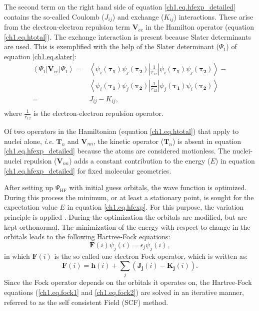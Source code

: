The second term on the right hand side of equation \ref{ch1.eq.hfexp_detailed} contains the so-called Coulomb ($J_{ij}$) and exchange ($K_{ij}$) interactions. These arise from the electron-electron repulsion term $\mathbf{V}_{ee}$ in the Hamilton operator (equation \ref{ch1.eq.htotal}). The exchange interaction is present because Slater determinants are used. This is exemplified with the help of the Slater determinant ($\Psi_1$) of equation \ref{ch1.eq.slater}:
\begin{equation}
\begin{split}
\left< \Psi_1 | \mathbf{V}_{ee} | \Psi_1 \right> = & \left< \psi_i(\mathbf{\tau_1})\psi_j(\mathbf{\tau_2}) | \frac{1}{r_{12}} | \psi_i(\mathbf{\tau_1})\psi_j(\mathbf{\tau_2}) \right> - \\
& \left< \psi_i(\mathbf{\tau_1})\psi_j(\mathbf{\tau_2}) | \frac{1}{r_{12}} | \psi_j(\mathbf{\tau_1})\psi_i(\mathbf{\tau_2}) \right> \\
= & J_{ij} - K_{ij}, \\
\end{split}
\end{equation}
where $\frac{1}{r_{12}}$ is the electron-electron repulsion operator.

Of two operators in the Hamiltonian (equation \ref{ch1.eq.htotal}) that apply to nuclei alone, \textit{i.e.} $\mathbf{T}_{n}$ and $\mathbf{V}_{nn}$, the kinetic operator ($\mathbf{T}_{n}$) is absent in equation \ref{ch1.eq.hfexp_detailed} because the atoms are considered motionless. The nuclei-nuclei repulsion ($\mathbf{V}_{nn}$) adds a constant contribution to the energy ($E$) in equation \ref{ch1.eq.hfexp_detailed} for fixed molecular geometries.

After setting up $\Psi_\mathrm{HF}$ with initial guess orbitals, the wave function is optimized. During this process the minimum, or at least a stationary point, is sought for the expectation value $E$ in equation \ref{ch1.eq.hfexp}. For this purpose, the variation principle is applied \cite{varia}. During the optimization the orbitals are modified, but are kept orthonormal. The minimization of the energy with respect to change in the orbitals leads to the following Hartree-Fock equations:
\begin{equation}
\mathbf{F}(i)\psi_j(i)=\epsilon_j \psi_j(i),
\label{ch1.eq.fock1}
\end{equation}
in which $\mathbf{F}(i)$ is the so called one electron Fock operator, which is written as:
\begin{equation}
\mathbf{F}(i)=\mathbf{h}(i) + \sum_j (\mathbf{J_j}(i) - \mathbf{K_j}(i)).
\label{ch1.eq.fock2}
\end{equation}
Since the Fock operator depends on the orbitals it operates on, the Hartree-Fock equations (\ref{ch1.eq.fock1} and \ref{ch1.eq.fock2}) are solved in an iterative manner, referred to as the self consistent Field (SCF) method.

